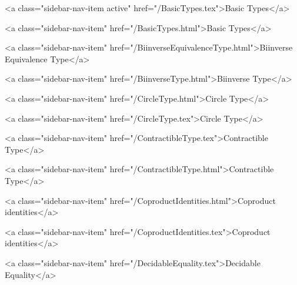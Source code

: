           <a class="sidebar-nav-item active" href="/BasicTypes.tex">Basic Types</a>
        
      
    
      
        
          <a class="sidebar-nav-item" href="/BasicTypes.html">Basic Types</a>
        
      
    
      
        
          <a class="sidebar-nav-item" href="/BiinverseEquivalenceType.html">Biinverse Equivalence Type</a>
        
      
    
      
        
          <a class="sidebar-nav-item" href="/BiinverseType.html">Biinverse Type</a>
        
      
    
      
        
          <a class="sidebar-nav-item" href="/CircleType.html">Circle Type</a>
        
      
    
      
        
          <a class="sidebar-nav-item" href="/CircleType.tex">Circle Type</a>
        
      
    
      
        
          <a class="sidebar-nav-item" href="/ContractibleType.tex">Contractible Type</a>
        
      
    
      
        
          <a class="sidebar-nav-item" href="/ContractibleType.html">Contractible Type</a>
        
      
    
      
        
          <a class="sidebar-nav-item" href="/CoproductIdentities.html">Coproduct identities</a>
        
      
    
      
        
          <a class="sidebar-nav-item" href="/CoproductIdentities.tex">Coproduct identities</a>
        
      
    
      
        
          <a class="sidebar-nav-item" href="/DecidableEquality.tex">Decidable Equality</a>
        
      
    
